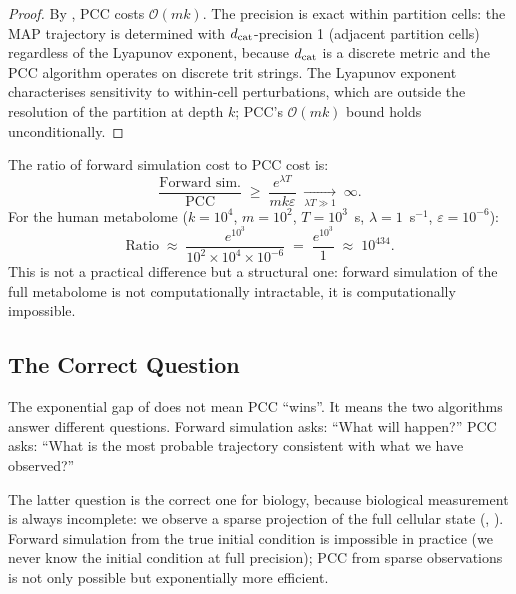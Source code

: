 \begin{proof}
By , PCC costs $\mathcal{O}(mk)$.  The precision
is exact within partition cells: the MAP trajectory is determined with
$d_{\mathrm{cat}}$-precision 1 (adjacent partition cells) regardless of the Lyapunov
exponent, because $d_{\mathrm{cat}}$ is a discrete metric and the PCC algorithm operates
on discrete trit strings.  The Lyapunov exponent characterises sensitivity to
within-cell perturbations, which are outside the resolution of the partition
at depth $k$; PCC's $\mathcal{O}(mk)$ bound holds unconditionally.
\end{proof}

\begin{corollary}
\label{cor:complexity-gap}
The ratio of forward simulation cost to PCC cost is:
\begin{equation}
    \frac{\text{Forward sim.}}{\text{PCC}}
    \;\ge\;
    \frac{e^{\lambda T}}{mk\varepsilon}
    \;\xrightarrow[\lambda T \gg 1]{}\; \infty.
\end{equation}
For the human metabolome ($k = 10^4$, $m = 10^2$, $T = 10^3$~s,
$\lambda = 1$~s$^{-1}$, $\varepsilon = 10^{-6}$):
\[
    \text{Ratio} \;\approx\; \frac{e^{10^3}}{10^2 \times 10^4 \times 10^{-6}}
    \;=\; \frac{e^{10^3}}{1}
    \;\approx\; 10^{434}.
\]
This is not a practical difference but a structural one: forward simulation
of the full metabolome is not computationally intractable, it is
computationally impossible.
\end{corollary}

\subsection{The Correct Question}

The exponential gap of  does not mean PCC ``wins''.
It means the two algorithms answer different questions.  Forward simulation
asks: ``What will happen?''  PCC asks: ``What is the most probable trajectory
consistent with what we have observed?''

The latter question is the correct one for biology, because biological
measurement is always incomplete: we observe a sparse projection of the full
cellular state (, ).
Forward simulation from the true initial condition is impossible in practice
(we never know the initial condition at full precision); PCC from sparse
observations is not only possible but exponentially more efficient.

